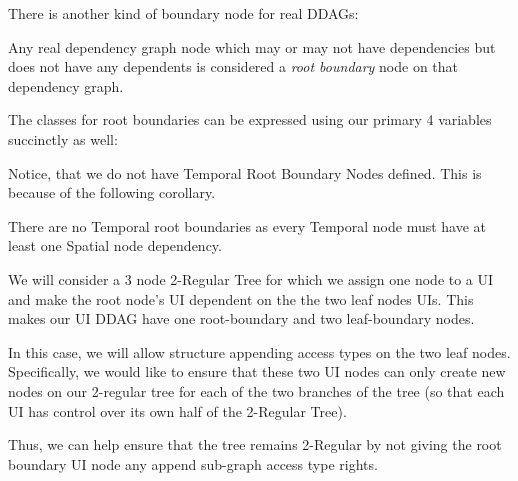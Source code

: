 There is another kind of boundary node for real DDAGs:

\begin{con-def}
	\label{root-boundaries}
	Any real dependency graph node which may or may not have dependencies but does not have any dependents is considered a \textit{root boundary} node on that dependency graph.
\end{con-def}

The classes for root boundaries can be expressed using our primary 4 variables succinctly as well:

\noindent{}


Notice, that we do not have Temporal Root Boundary Nodes defined. This is because of the following corollary.

\begin{con-cor}
	\label{no-temp-root-bounds}
	There are no Temporal root boundaries as every Temporal node must have at least one Spatial node dependency.
\end{con-cor}

\begin{con-ex} 
	\label{2-regular-tree}
	We will consider a 3 node 2-Regular Tree for which we assign one node to a UI and make the root node's UI dependent on the the two leaf nodes UIs. This makes our UI DDAG have one root-boundary and two leaf-boundary nodes.


In this case, we will allow structure appending access types on the two leaf nodes. Specifically, we would like to ensure that these two UI nodes can only create new nodes on our 2-regular tree for each of the two branches of the tree (so that each UI has control over its own half of the 2-Regular Tree).

Thus, we can help ensure that the tree remains 2-Regular by not giving the root boundary UI node any append sub-graph access type rights.
\end{con-ex}

